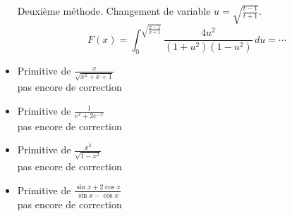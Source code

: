 \begin{itemize}
Deuxième méthode.\newline
Changement de variable $u = \sqrt{\frac{t-1}{t+1}}$.
\[
 F(x) = \int_{0}^{\sqrt{\frac{x-1}{x+1}}} \frac{4u^2}{(1+u^2)(1-u^2)}\,du = \cdots
\]
 
 
 \item Primitive de $\frac{x}{\sqrt{x^2+x+1}} $\\pas encore de correction
 \item Primitive de $\frac{1}{e^x+2e^{-x}} $\\pas encore de correction
 \item Primitive de $\frac{x^2}{\sqrt{1-x^2}} $\\pas encore de correction
 \item Primitive de $\frac{\sin x +2\cos x}{\sin x -\cos x} $\\pas encore de correction
\end{itemize}
